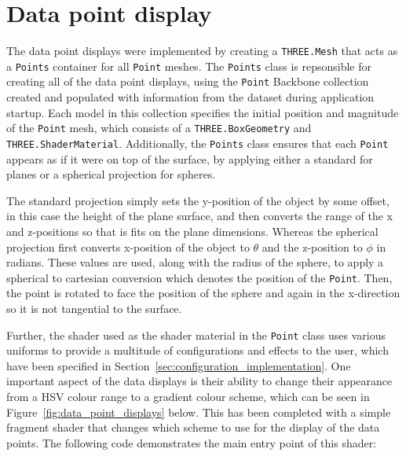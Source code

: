 \section{Data point display} {
\label{sec:data_point_display}

	The data point displays were implemented by creating a \texttt{THREE.Mesh} that acts as a \texttt{Points} container for all \texttt{Point} meshes. The \texttt{Points} class is repsonsible for creating all of the data point displays, using the \texttt{Point} Backbone collection created and populated with information from the dataset during application startup. Each model in this collection specifies the initial position and magnitude of the \texttt{Point} mesh, which consists of a \texttt{THREE.BoxGeometry} and \texttt{THREE.ShaderMaterial}. Additionally, the \texttt{Points} class ensures that each \texttt{Point} appears as if it were on top of the surface, by applying either a standard for planes or a spherical projection for spheres.

	The standard projection simply sets the y-position of the object by some offset, in this case the height of the plane surface, and then converts the range of the x and z-positions so that is fits on the plane dimensions. Whereas the spherical projection first converts x-position of the object to $\theta$ and the z-position to $\phi$ in radians. These values are used, along with the radius of the sphere, to apply a spherical to cartesian conversion which denotes the position of the \texttt{Point}. Then, the point is rotated to face the position of the sphere and again in the x-direction so it is not tangential to the surface.

	Further, the shader used as the shader material in the \texttt{Point} class uses various uniforms to provide a multitude of configurations and effects to the user, which have been specified in Section~\ref{sec:configuration_implementation}. One important aspect of the data displays is their ability to change their appearance from a HSV colour range to a gradient colour scheme, which can be seen in Figure~\ref{fig:data_point_displays} below. This has been completed with a simple fragment shader that changes which scheme to use for the display of the data points. The following code demonstrates the main entry point of this shader:

	

	

}

